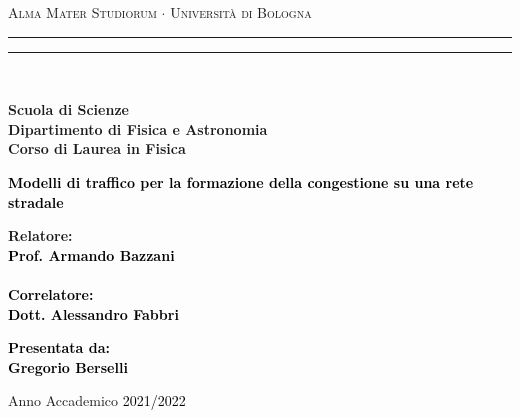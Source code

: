 \documentclass[12pt,a4paper]{report}
\begin{document}
\begin{titlepage}
\begin{center}
{{\Large{\textsc{Alma Mater Studiorum $\cdot$ Universit\`a di Bologna}}}} 
\rule[0.1cm]{15.8cm}{0.1mm}
\rule[0.5cm]{15.8cm}{0.6mm}
\\\vspace{3mm}

{\small{\bf Scuola di Scienze \\ 
Dipartimento di Fisica e Astronomia\\
Corso di Laurea in Fisica}}

\end{center}

\vspace{23mm}

\begin{center}\textcolor{black}{
{\LARGE{\bf Modelli di traffico per la formazione della congestione su una rete stradale}}\\
}\end{center}

\vspace{50mm} \par \noindent

\begin{minipage}[t]{0.47\textwidth}
{\large{\bf Relatore: \vspace{2mm}\\\textcolor{black}{
Prof. Armando Bazzani}\\\\
\textcolor{black}{
\bf Correlatore:
\vspace{2mm}\\
Dott. Alessandro Fabbri\\}
}}\end{minipage}
%
\hfill
%
\begin{minipage}[t]{0.47\textwidth}\raggedleft \textcolor{black}{
{\large{\bf Presentata da:
\vspace{2mm}\\
Gregorio Berselli}}}
\end{minipage}

\vspace{40mm}

\begin{center}
Anno Accademico \textcolor{black}{2021/2022}
\end{center}

\end{titlepage}
\shipout\null
\end{document}
